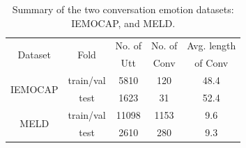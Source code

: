 \documentclass[letterpaper]{article} %
\begin{document}
\begin{table}[t]
\small
\centering
\begin{threeparttable}
\begin{tabular}{c|c|c|c|c}
\toprule
\multirow{2}{*}{Dataset}
& \multirow{2}{*}{Fold}
& \multicolumn{1}{c|}{\footnotesize{No. of}}
& \multicolumn{1}{c|}{\footnotesize{No. of}}
& \multicolumn{1}{c}{\footnotesize{Avg. length}} \\
& & \footnotesize{Utt} & \footnotesize{Conv} & \footnotesize{of Conv} \\
\hline
\hline
\multirow{2}{*}{IEMOCAP}
& train/val & {5810} & 120 & 48.4 \\
& test & {1623} & 31& 52.4 \\
\multirow{2}{*}{MELD}
& train/val & {11098} & {1153}& 9.6 \\
& test & {2610} & 280& 9.3 \\
\bottomrule
\end{tabular}
\end{threeparttable}
\caption{\label{table:datasets}Summary of the two conversation emotion datasets: IEMOCAP, and MELD.}
\end{table}
\end{document}
